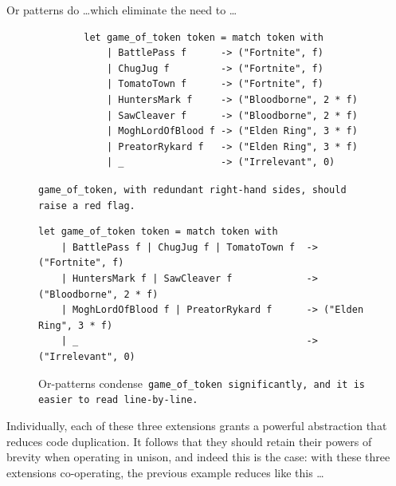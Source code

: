 \documentclass[manuscript,screen 12pt, nonacm]{acmart}
\begin{document}
    Or patterns do \dots which eliminate the need to \dots

     \begin{figure}
            \begin{center}
                \begin{verbatim}
        let game_of_token token = match token with 
            | BattlePass f      -> ("Fortnite", f)
            | ChugJug f         -> ("Fortnite", f)
            | TomatoTown f      -> ("Fortnite", f)
            | HuntersMark f     -> ("Bloodborne", 2 * f)
            | SawCleaver f      -> ("Bloodborne", 2 * f)
            | MoghLordOfBlood f -> ("Elden Ring", 3 * f)
            | PreatorRykard f   -> ("Elden Ring", 3 * f)
            | _                 -> ("Irrelevant", 0)
                \end{verbatim}
            \end{center}    

        \caption{\tt{game\_of\_token}, with redundant right-hand sides,
        should raise a red flag.} 
        \label{fig:baregot}
        \end{figure}


          \begin{figure}
    \begin{center}
    \begin{verbatim}
let game_of_token token = match token with 
    | BattlePass f | ChugJug f | TomatoTown f  -> ("Fortnite", f)
    | HuntersMark f | SawCleaver f             -> ("Bloodborne", 2 * f)
    | MoghLordOfBlood f | PreatorRykard f      -> ("Elden Ring", 3 * f)
    | _                                        -> ("Irrelevant", 0)
    \end{verbatim}
    \end{center}    
    \caption{Or-patterns condense~\tt{game\_of\_token}
    significantly, and it is easier to read line-by-line.} 
    \label{fig:orgot}
    \end{figure}

    \newpage
    Individually, each of these three extensions grants a powerful abstraction
    that reduces code duplication. It follows that they should retain their
    powers of brevity when operating in unison, and indeed this is the case:
    with these three extensions co-operating, the previous example reduces like
    this \dots
\end{document}
